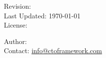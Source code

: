 \thispagestyle{empty}

\begin{flushleft}
    \textbf{\Large \booktitle}

    \vspace{1cm}

    Revision: \GitTag\\
    Last Updated: \today \\
    License: \booklicence

    \vspace{1cm}

    Author: \bookauthor\\
    Contact: \url{info@ctoframework.com}

\end{flushleft}